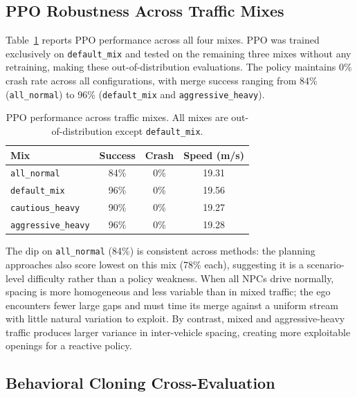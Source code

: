 \documentclass[conference]{IEEEtran}
\begin{document}
\subsection{PPO Robustness Across Traffic Mixes}

Table~\ref{tab:ppo_mixes} reports PPO performance across all four mixes.
PPO was trained exclusively on \texttt{default\_mix} and tested on the
remaining three mixes without any retraining, making these out-of-distribution
evaluations.
The policy maintains 0\% crash rate across all configurations, with merge
success ranging from 84\% (\texttt{all\_normal}) to 96\% (\texttt{default\_mix}
and \texttt{aggressive\_heavy}).

\begin{table}[t]
  \caption{PPO performance across traffic mixes. All mixes are
    out-of-distribution except \texttt{default\_mix}.}
  \label{tab:ppo_mixes}
  \centering
  \begin{tabular}{lccc}
    \toprule
    Mix & Success & Crash & Speed (m/s) \\
    \midrule
    \texttt{all\_normal}       & 84\% & 0\% & 19.31 \\
    \texttt{default\_mix}      & 96\% & 0\% & 19.56 \\
    \texttt{cautious\_heavy}   & 90\% & 0\% & 19.27 \\
    \texttt{aggressive\_heavy} & 96\% & 0\% & 19.28 \\
    \bottomrule
  \end{tabular}
\end{table}

The dip on \texttt{all\_normal} (84\%) is consistent across methods:
the planning approaches also score lowest on this mix (78\% each),
suggesting it is a scenario-level difficulty rather than a policy
weakness.
When all NPCs drive normally, spacing is more homogeneous and less
variable than in mixed traffic; the ego encounters fewer large gaps
and must time its merge against a uniform stream with little natural
variation to exploit.
By contrast, mixed and aggressive-heavy traffic produces larger
variance in inter-vehicle spacing, creating more exploitable openings
for a reactive policy.

\subsection{Behavioral Cloning Cross-Evaluation}
\end{document}
